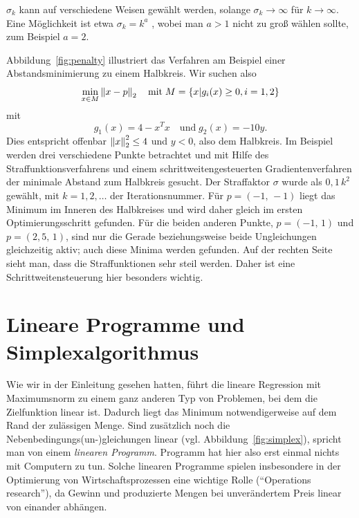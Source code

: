 $\sigma_k$ kann auf verschiedene Weisen gewählt werden, solange
$\sigma_k\to \infty$ für $k\to\infty$. Eine Möglichkeit ist etwa
$\sigma_k=k^a$ , wobei man $a>1$ nicht zu groß wählen sollte, zum
Beispiel $a=2$.

Abbildung~\ref{fig:penalty} illustriert das Verfahren am Beispiel
einer Abstandsminimierung zu einem Halbkreis. Wir suchen also
\begin{equation}
  \min_{x\in M} \left\lVert{x - p}\right\rVert_2\quad\text{mit}\;
  M = \{ x | g_i(x) \ge 0, i=1,2 \}
\end{equation}
mit
\begin{equation*}
  g_1(x) = 4 - x^Tx\quad\text{und}\; g_2(x) = -10y.
\end{equation*}
Dies entspricht offenbar $\left\lVert{x}\right\rVert^2_2\le 4$ und $y<0$, also dem
Halbkreis. Im Beispiel werden drei verschiedene Punkte betrachtet und
mit Hilfe des Straffunktionsverfahrens und einem
schrittweitengesteuerten Gradientenverfahren der minimale Abstand zum
Halbkreis gesucht. Der Straffaktor $\sigma$ wurde als $0,1\,k^2$
gewählt, mit $k=1,2,\ldots$ der Iterationsnummer. Für $p=(-1,\,-1)$
liegt das Minimum im Inneren des Halbkreises und wird daher gleich im
ersten Optimierungsschritt gefunden. Für die beiden anderen Punkte,
$p=(-1,\,1)$ und $p=(2,5,\,1)$, sind nur die Gerade beziehungsweise beide
Ungleichungen gleichzeitig aktiv; auch diese Minima werden
gefunden. Auf der rechten Seite sieht man, dass die Straffunktionen
sehr steil werden. Daher ist eine Schrittweitensteuerung hier
besonders wichtig.

\section{Lineare Programme und Simplexalgorithmus}

Wie wir in der Einleitung gesehen hatten, führt die lineare Regression
mit Maximumsnorm zu einem ganz anderen Typ von Problemen, bei dem die
Zielfunktion linear ist. Dadurch liegt das Minimum notwendigerweise
auf dem Rand der zulässigen Menge. Sind zusätzlich noch die
Nebenbedingungs(un-)gleichungen linear
(vgl. Abbildung~\ref{fig:simplex}), spricht man von einem
\emph{linearen Programm}. Programm hat hier also erst einmal nichts
mit Computern zu tun. Solche linearen Programme spielen insbesondere
in der Optimierung von Wirtschaftsprozessen eine wichtige Rolle
("`Operations research"'), da Gewinn und produzierte Mengen bei
unverändertem Preis linear von einander abhängen.

